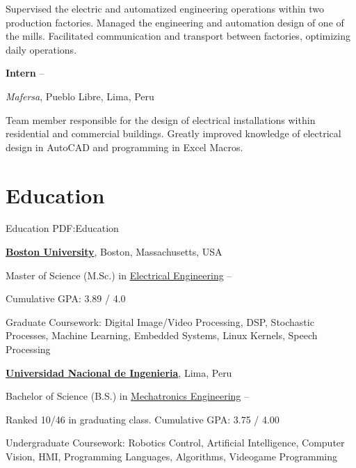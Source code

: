 \documentclass[letterpaper,MMMyyyy,nonstop]{simpleresumecv}
\begin{document}
\begin{body}
\GapNoBreak
\BulletItem
Supervised the electric and automatized engineering operations within two production factories.
\BulletItem
Managed the engineering and automation design of one of the mills. Facilitated communication and transport between factories, optimizing daily operations.

\BigGap
\textbf{Intern}
\hfill
{} --
\begin{detail}
\normalsize{ \textit{Mafersa},
Pueblo Libre, Lima, Peru }
\end{detail}

\GapNoBreak
\BulletItem
Team member responsible for the design of electrical installations within residential and commercial buildings.
\BulletItem
Greatly improved knowledge of electrical design in AutoCAD and programming in Excel Macros.


\section
{Education}
{Education}
{PDF:Education}

\href{http://www.bu.edu/}
{\textbf{Boston University}},
Boston, Massachusetts, USA

\GapNoBreak
\BulletItem
Master of Science (M.Sc.) in
\href{http://www.bu.edu/ece/}
{Electrical Engineering}
\hfill
{} --
\begin{detail}
\SubBulletItem
Cumulative GPA: 3.89 / 4.0
\end{detail}
\BulletItem
Graduate Coursework: Digital Image/Video Processing, DSP, Stochastic Processes, Machine Learning, Embedded Systems, Linux Kernels, Speech Processing

\BigGap
\href{http://www.uni.edu.pe/}
{\textbf{Universidad Nacional de Ingenieria}},
Lima, Peru

\GapNoBreak
\BulletItem
Bachelor of Science (B.S.) in
\href{http://www.fim.uni.edu.pe/}
{Mechatronics Engineering}
\hfill
{} --
\begin{detail}
\SubBulletItem
Ranked 10/46 in graduating class.
\SubBulletItem
Cumulative GPA: 3.75 / 4.00
\end{detail}
\BulletItem
Undergraduate Coursework: Robotics Control, Artificial Intelligence, Computer Vision, HMI, Programming Languages, Algorithms, Videogame Programming


\end{body}
\end{document}
